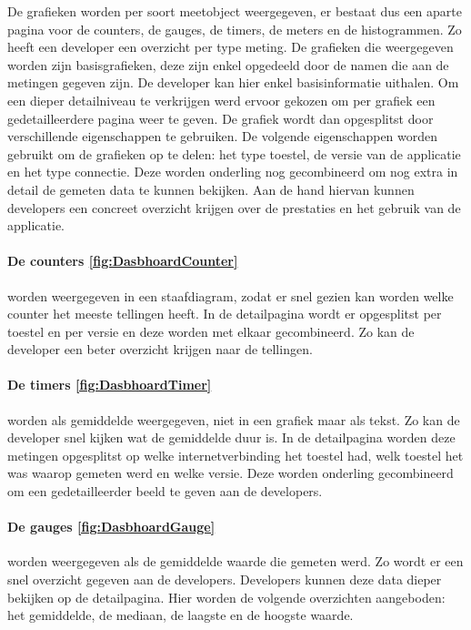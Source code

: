 De grafieken worden per soort meetobject weergegeven, er bestaat dus een aparte pagina voor de counters, de gauges, de timers, de meters en de histogrammen. Zo heeft een developer een overzicht per type meting. De grafieken die weergegeven worden zijn basisgrafieken, deze zijn enkel opgedeeld door de namen die aan de metingen gegeven zijn. De developer kan hier enkel basisinformatie uithalen. Om een dieper detailniveau te verkrijgen werd ervoor gekozen om per grafiek een gedetailleerdere pagina weer te geven. De grafiek wordt dan opgesplitst door verschillende eigenschappen te gebruiken. De volgende eigenschappen worden gebruikt om de grafieken op te delen: het type toestel, de versie van de applicatie en het type connectie. Deze worden onderling nog gecombineerd om nog extra in detail de gemeten data te kunnen bekijken. Aan de hand hiervan kunnen developers een concreet overzicht krijgen over de prestaties en het gebruik van de applicatie. \\

\paragraph{De counters \ref{fig:DasbhoardCounter}} worden weergegeven in een staafdiagram, zodat er snel gezien kan worden welke counter het meeste tellingen heeft. In de detailpagina wordt er opgesplitst per toestel en per versie en deze worden met elkaar gecombineerd. Zo kan de developer een beter overzicht krijgen naar de tellingen.\\

\paragraph{De timers \ref{fig:DasbhoardTimer}} worden als gemiddelde weergegeven, niet in een grafiek maar als tekst. Zo kan de developer snel kijken wat de gemiddelde duur is. In de detailpagina worden deze metingen opgesplitst op welke internetverbinding het toestel had, welk toestel het was waarop gemeten werd en welke versie. Deze worden onderling gecombineerd om een gedetailleerder beeld te geven aan de developers.\\

\paragraph{De gauges \ref{fig:DasbhoardGauge}} worden weergegeven als de gemiddelde waarde die gemeten werd. Zo wordt er een snel overzicht gegeven aan de developers. Developers kunnen deze data dieper bekijken op de detailpagina. Hier worden de volgende overzichten aangeboden: het gemiddelde, de mediaan, de laagste en de hoogste waarde. \\


